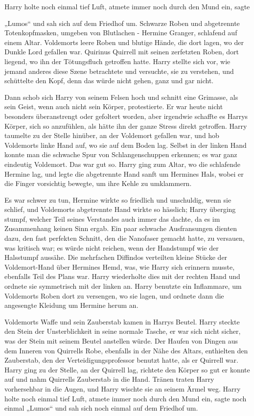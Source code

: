 {Harry holte noch einmal tief Luft, atmete immer noch durch den Mund ein, sagte

„Lumos“ und sah sich auf dem Friedhof um. Schwarze Roben und abgetrennte Totenkopfmasken, umgeben von Blutlachen - Hermine Granger, schlafend auf einem Altar. Voldemorts leere Roben und blutige Hände, die dort lagen, wo der Dunkle Lord gefallen war. Quirinus Quirrell mit seinen zerfetzten Roben, dort liegend, wo ihn der Tötungsfluch getroffen hatte. Harry stellte sich vor, wie jemand anderes diese Szene betrachtete und versuchte, sie zu verstehen, und schüttelte den Kopf, denn das würde nicht gehen, ganz und gar nicht.

Dann schob sich Harry von seinem Felsen hoch und schnitt eine Grimasse, als sein Geist, wenn auch nicht sein Körper, protestierte. Er war heute nicht besonders überanstrengt oder gefoltert worden, aber irgendwie schaffte es Harrys Körper, sich so anzufühlen, als hätte ihn der ganze Stress direkt getroffen. Harry taumelte zu der Stelle hinüber, an der Voldemort gefallen war, und hob Voldemorts linke Hand auf, wo sie auf dem Boden lag. Selbst in der linken Hand konnte man die schwache Spur von Schlangenschuppen erkennen; es war ganz eindeutig Voldemort. Das war gut so. Harry ging zum Altar, wo die schlafende Hermine lag, und legte die abgetrennte Hand sanft um Hermines Hals, wobei er die Finger vorsichtig bewegte, um ihre Kehle zu umklammern.

Es war schwer zu tun, Hermine wirkte so friedlich und unschuldig, wenn sie schlief, und Voldemorts abgetrennte Hand wirkte so hässlich; Harry überging stumpf, welcher Teil seines Verstandes auch immer das dachte, da es im Zusammenhang keinen Sinn ergab. Ein paar schwache Ausfransungen dienten dazu, den fast perfekten Schnitt, den die Nanofaser gemacht hatte, zu versauen, was kritisch war; es würde nicht reichen, wenn der Handstumpf wie der Halsstumpf aussähe. Die mehrfachen Diffindos verteilten kleine Stücke der Voldemort-Hand über Hermines Hemd, was, wie Harry sich erinnern musste, ebenfalls Teil des Plans war. Harry wiederholte dies mit der rechten Hand und ordnete sie symmetrisch mit der linken an. Harry benutzte ein Inflammare, um Voldemorts Roben dort zu versengen, wo sie lagen, und ordnete dann die angesengte Kleidung um Hermine herum an.

Voldemorts Waffe und sein Zauberstab kamen in Harrys Beutel. Harry steckte den Stein der Unsterblichkeit in seine normale Tasche, er war sich nicht sicher, was der Stein mit seinem Beutel anstellen würde. Der Haufen von Dingen aus dem Inneren von Quirrells Robe, ebenfalls in der Nähe des Altars, enthielten den Zauberstab, den der Verteidigungsprofessor benutzt hatte, als er Quirrell war. Harry ging zu der Stelle, an der Quirrell lag, richtete den Körper so gut er konnte auf und nahm Quirrells Zauberstab in die Hand. Tränen traten Harry vorhersehbar in die Augen, und Harry wischte sie an seinem Ärmel weg. Harry holte noch einmal tief Luft, atmete immer noch durch den Mund ein, sagte noch einmal „Lumos“ und sah sich noch einmal auf dem Friedhof um.

}
